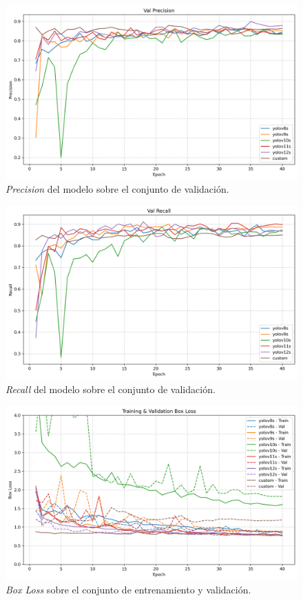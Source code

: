 \documentclass[12pt,a4paper,onecolumn,oneside]{report}
\begin{document}
\begin{figure}[htbp]
  \centering
  \includegraphics[width=1.0\textwidth]{figuras/yolo_plots/precision.png}
  \caption{\textit{Precision} del modelo sobre el conjunto de validación.}
  \label{fig:yolo_train_precision}
\end{figure}

\begin{figure}[htbp]
  \centering
  \includegraphics[width=1.0\textwidth]{figuras/yolo_plots/recall.png}
  \caption{\textit{Recall} del modelo sobre el conjunto de validación.}
  \label{fig:yolo_train_recall}
\end{figure}

\begin{figure}[htbp]
  \centering
  \includegraphics[width=1.0\textwidth]{figuras/yolo_plots/box_loss.png}
  \caption{\textit{Box Loss} sobre el conjunto de entrenamiento y validación.}
  \label{fig:yolo_train_box_loss}
\end{figure}
\end{document}
